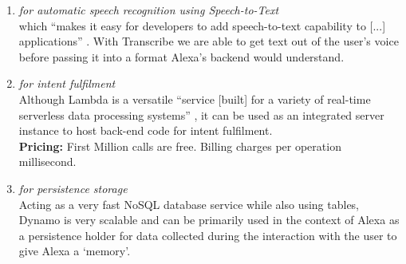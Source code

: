 \begin{enumerate}
	
	\item[\href{https://aws.amazon.com/transcribe/}{\textbf{Transcribe}} \footnote{\url{https://aws.amazon.com/transcribe}}] \textit{for automatic speech recognition using Speech-to-Text}\\
	which ``makes it easy for developers to add speech-to-text capability to [...] applications'' \cite{aws_website}. With Transcribe we are able to get text out of the user's voice before passing it into a format Alexa's backend would understand.
	
%	
	

	\item[\href{https://aws.amazon.com/lambda/}{\textbf{Lambda}} \footnote{\url{https://aws.amazon.com/lambda}}] \textit{for intent fulfilment}\\
	Although Lambda is a versatile ``service [built] for a variety of real-time serverless data processing systems'' \cite{aws_website}, it can be used as an integrated server instance to host back-end code for intent fulfilment.\\	 %
	\textbf{Pricing:} First Million calls are free. Billing charges per operation millisecond.

	
%	
%



\item[\href{https://aws.amazon.com/dynamodb/}{\textbf{DynamoDB}} \footnote{\url{https://aws.amazon.com/dynamodb}}] \textit{for persistence storage}\\
Acting as a very fast NoSQL database service while also using tables,
Dynamo is very scalable and can be primarily used in the context of Alexa as a persistence holder for data collected during the interaction with the user to give Alexa a `memory'.




\end{enumerate}
